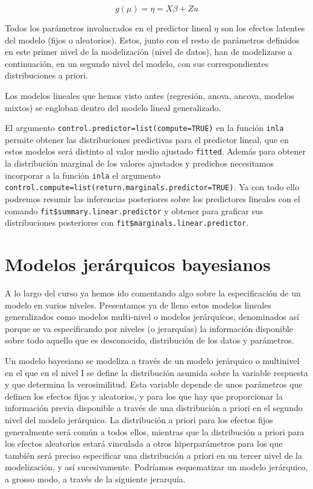 \documentclass[
]{book}
\begin{document}
\[g(\mu)=\eta=X\beta + Z u\]

Todos los parámetros involucrados en el predictor lineal \(\eta\) son los
efectos latentes del modelo (fijos o aleatorios). Estos, junto con el
resto de parámetros definidos en este primer nivel de la modelización
(nivel de datos), han de modelizarse a continuación, en un segundo nivel
del modelo, con sus correspondientes distribuciones a priori.

Los modelos lineales que hemos visto antes (regresión, anova, ancova,
modelos mixtos) se engloban dentro del modelo lineal generalizado.

El argumento \texttt{control.predictor=list(compute=TRUE)} en la función \texttt{inla}
permite obtener las distribuciones predictivas para el predictor lineal,
que en estos modelos será distinto al valor medio ajustado \texttt{fitted}.
Además para obtener la distribución marginal de los valores ajustados y
predichos necesitamos incorporar a la función \texttt{inla} el argumento
\texttt{control.compute=list(return.marginals.predictor=TRUE)}. Ya con todo
ello podremos resumir las inferencias posteriores sobre los predictores
lineales con el comando \texttt{fit\$summary.linear.predictor} y obtener para
graficar sus distribuciones posteriores con
\texttt{fit\$marginals.linear.predictor}.

\hypertarget{modelos-jeruxe1rquicos-bayesianos}{%
\section{Modelos jerárquicos bayesianos}\label{modelos-jeruxe1rquicos-bayesianos}}

A lo largo del curso ya hemos ido comentando algo sobre la
especificación de un modelo en varios niveles. Presentamos ya de lleno
estos modelos lineales generalizados como modelos multi-nivel o modelos
jerárquicos, denominados así porque se va especificando por niveles (o
jerarquías) la información disponible sobre todo aquello que es
desconocido, distribución de los datos y parámetros.

Un modelo bayesiano se modeliza a través de un modelo jerárquico o
multinivel en el que en el nivel I se define la distribución asumida
sobre la variable respuesta y que determina la verosimilitud. Esta
variable depende de unos parámetros que definen los efectos fijos y
aleatorios, y para los que hay que proporcionar la información previa
disponible a través de una distribución a priori en el segundo nivel del
modelo jerárquico. La distribución a priori para los efectos fijos
generalmente será común a todos ellos, mientras que la distribución a
priori para los efectos aleatorios estará vinculada a otros
hiperparámetros para los que también será preciso especificar una
distribución a priori en un tercer nivel de la modelización, y así
sucesivamente. Podríamos esquematizar un modelo jerárquico, a grosso
modo, a través de la siguiente jerarquía.
\end{document}
